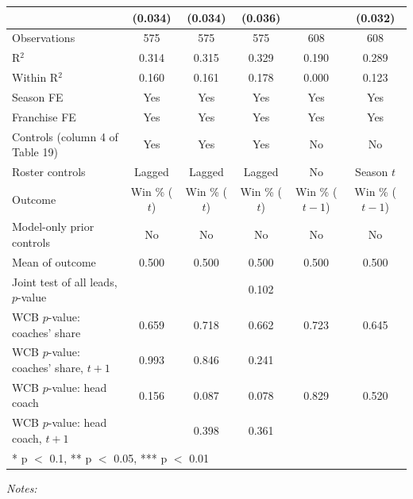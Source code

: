 \begin{table}[!h]
{\begin{threeparttable}
\begin{tabular}[t]{lccccc}
 & (0.034) & (0.034) & (0.036) &  & (0.032)\\
\midrule
Observations & 575 & 575 & 575 & 608 & 608\\
R$^2$ & 0.314 & 0.315 & 0.329 & 0.190 & 0.289\\
Within R$^2$ & 0.160 & 0.161 & 0.178 & 0.000 & 0.123\\
Season FE & Yes & Yes & Yes & Yes & Yes\\
Franchise FE & Yes & Yes & Yes & Yes & Yes\\
Controls (column 4 of Table 19) & Yes & Yes & Yes & No & No\\
Roster controls & Lagged & Lagged & Lagged & No & Season $t$\\
Outcome & Win \% ($t$) & Win \% ($t$) & Win \% ($t$) & Win \% ($t-1$) & Win \% ($t-1$)\\
Model-only prior controls & No & No & No & No & No\\
Mean of outcome & 0.500 & 0.500 & 0.500 & 0.500 & 0.500\\
Joint test of all leads, $p$-value &  &  & 0.102 &  & \\
WCB $p$-value: coaches' share & 0.659 & 0.718 & 0.662 & 0.723 & 0.645\\
WCB $p$-value: coaches' share, $t+1$ & 0.993 & 0.846 & 0.241 &  & \\
WCB $p$-value: head coach & 0.156 & 0.087 & 0.078 & 0.829 & 0.520\\
WCB $p$-value: head coach, $t+1$ &  & 0.398 & 0.361 &  & \\
\bottomrule
\multicolumn{6}{l}{\rule{0pt}{1em}* p $<$ 0.1, ** p $<$ 0.05, *** p $<$ 0.01}\\
\end{tabular}
\begin{tablenotes}[para]
\item \textit{Notes:} 

\end{tablenotes}
\end{threeparttable}}
\end{table}
